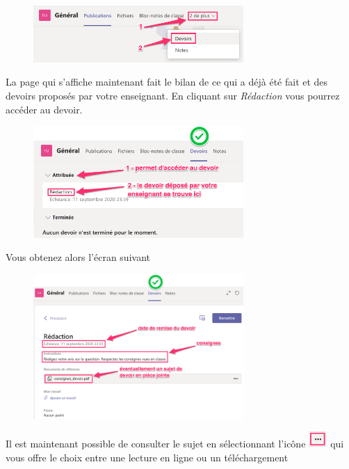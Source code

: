 \begin{figure}[H]
\includegraphics[width=8cm]{./images/teams/devoir1}
\centering
\end{figure}

La page qui s'affiche maintenant fait le bilan de ce qui a déjà été fait et des devoirs proposés par votre enseignant. En cliquant sur \textit{Rédaction} vous pourrez accéder au devoir.\\

\begin{figure}[h]
\includegraphics[width=8cm]{./images/teams/devoir2}
\centering
\end{figure}

 Vous obtenez alors l'écran suivant

\begin{figure}[h]
\includegraphics[width=8cm]{./images/teams/devoir3}
\centering
\end{figure}

Il est maintenant possible de consulter le sujet en sélectionnant l'icône \includegraphics[width=0.7cm]{./images/teams/pointilles} qui vous offre le choix entre une lecture en ligne ou un téléchargement

